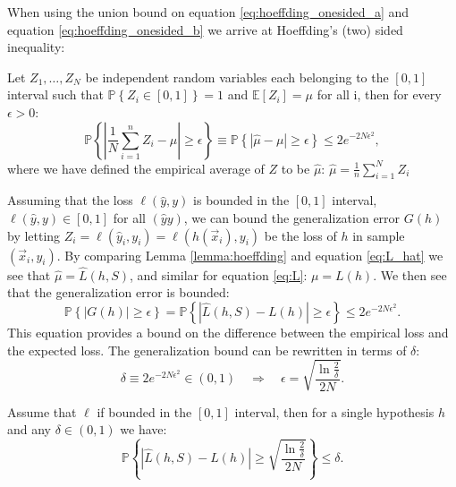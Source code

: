 When using the union bound on equation \eqref{eq:hoeffding_onesided_a} and equation \eqref{eq:hoeffding_onesided_b} we arrive at Hoeffding's (two) sided inequality:
\begin{lemma}
  \label{lemma:hoeffding}
  Let $Z_1, \dots, Z_N$ be independent random variables each belonging to the $[0, 1]$ interval such that $\mathbb{P}\left\{Z_i \in [0, 1] \right\} = 1$ and $\mathbb{E}[Z_i] = \mu$ for all i, then for every $\epsilon > 0$:
  \begin{equation}
    \mathbb{P} \left\{ \left| \frac{1}{N}\sum_{i=1}^n Z_i - \mu \right| \geq \epsilon \right\} \equiv \mathbb{P} \left\{ \left| \hat{\mu} - \mu \right| \geq \epsilon \right\} \leq 2 e^{-2N\epsilon^2},
    \label{eq:hoeffding_inequality}
  \end{equation}
  where we have defined the empirical average of $Z$ to be $\hat{\mu}$: $\hat{\mu}=\frac{1}{n}\sum_{i=1}^N Z_i $
\end{lemma}
Assuming that the loss $\ell(\hat{y}, y)$ is bounded in the $[0, 1]$ interval, $\ell(\hat{y}, y) \in [0, 1]$ for all $(\hat{y} y)$, we can bound the generalization error $G(h)$ by letting $Z_i = \ell(\hat{y}_i, y_i) = \ell(h(\vec{x}_i), y_i)$ be the loss of $h$ in sample $(\vec{x}_i, y_i)$. By comparing Lemma \ref{lemma:hoeffding} and equation \eqref{eq:L_hat} we see that $\hat{\mu} = \hat{L}(h, S)$, and similar for equation \eqref{eq:L}: $\mu = L(h)$. We then see that the generalization error is bounded:
\begin{equation}
  \label{eq:hoeffding_inequality_generalization_error}
  \mathbb{P} \left\{ \left| G(h) \right| \geq \epsilon \right\} = \mathbb{P} \left\{ \left| \hat{L}(h, S) - L(h) \right| \geq \epsilon \right\} \leq 2 e^{-2N\epsilon^2}.
\end{equation}
This equation provides a bound on the difference between the empirical loss and the expected loss. 
The generalization bound  can be rewritten in terms of $\delta$:
\begin{equation}
  \delta \equiv 2 e^{-2N\epsilon^2} \in (0, 1) \quad \Rightarrow \quad \epsilon = \sqrt{\frac{\ln \frac{2}{\delta}}{2N}}.
\end{equation}
\begin{theorem}
  \label{theorem:hoeffding_single}
  Assume that $\ell$ if bounded in the $[0, 1]$ interval, then for a single hypothesis $h$ and any $\delta\in(0,1)$ we have:  
  \begin{equation}
    \label{eq:hoeffding_inequality_generalization_error_delta}
    \mathbb{P} \left\{ \left| \hat{L}(h, S) - L(h) \right| \geq \sqrt{\frac{\ln \frac{2}{\delta}}{2N}}  \right\} \leq \delta.
  \end{equation}
\end{theorem}

